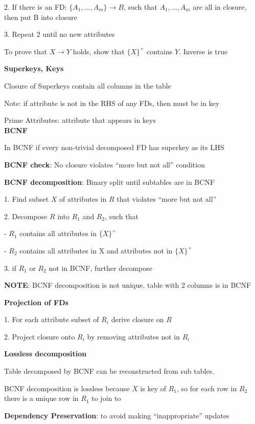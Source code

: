\documentclass[10pt, a4paper]{article}
\newcommand{\highlight}[1]{{\color{red}\textbf{#1}}}
\newcommand{\red}[1]{{\color{red}#1}}
\newcommand{\header}[1]{{\normalsize\textbf{#1}}}
\newcommand{\tab}[0]{\hspace*{2mm}}
\begin{document}
\begin{multicols*}{3}
		2. If there is an FD: $\{A_1, \dots , A_m\} \rightarrow B$, such that $A_1, \dots , A_m$ are all in closure, then put B into closure

		3. Repeat 2 until no new attributes

		To prove that $X \rightarrow Y$ holds, show that $\{X\}^+$ contains $Y$. Inverse is true

		\textbf{Superkeys, Keys}

		Closure of Superkeys contain all columns in the table

		\red{Note}: if attribute is not in the RHS of any FDs, then must be in key

		\red{Prime Attributes}: attribute that appears in keys\\

		\header{BCNF}

		In BCNF if \red{every non-trivial decomposed} FD has \red{superkey} as its LHS

		\textbf{BCNF check}: No closure violates ``more but not all'' condition
		
		\textbf{BCNF decomposition}: Binary split until subtables are in BCNF

		1. Find subset $X$ of attributes in $R$ that violates ``more but not all''

		2. Decompose $R$ into $R_1$ and $R_2$, such that 

		\tab - $R_1$ contains all attributes in $\{X\}^+$

		\tab - $R_2$ contains all attributes in X and attributes not in $\{X\}^+$

		3. if $R_1$ or $R_2$ not in BCNF, further decompose

		\highlight{NOTE}: BCNF decomposition is not unique, table with \red{2} columns is in BCNF

		\textbf{Projection of FDs}
		
		1. For each attribute subset of $R_i$ derive closure on $R$

		2. Project closure onto $R_i$ by removing attributes not in $R_i$

		\textbf{Lossless decomposition}

		Table decomposed by BCNF can be reconstructed from sub tables.

		BCNF decomposition is lossless because $X$ is key of $R_1$, so for each row in $R_2$ there is a unique row in $R_1$ to join to

		\textbf{Dependency Preservation}: to avoid making ``inappropriate'' updates


\end{multicols*}
\end{document}
